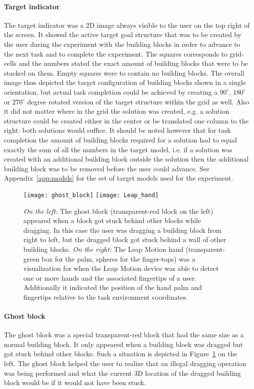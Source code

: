 \paragraph{Target indicator}
The target indicator was a 2D image always visible to the user on the top right of the screen. It showed the active target goal structure that was to be created by the user during the experiment with the building blocks in order to advance to the next task and to complete the experiment. The squares corresponds to grid-cells and the numbers stated the exact amount of building blocks that were to be stacked on them. Empty squares were to contain no building blocks. The overall image thus depicted the target configuration of building blocks shown in a single orientation, but actual task completion could be achieved by creating a $90^{\circ}$, $180^{\circ}$ or $270^{\circ}$ degree rotated version of the target structure within the grid as well. Also it did not matter where in the grid the solution was created, e.g. a solution structure could be created either in the center or be translated one column to the right: both solutions would suffice. It should be noted however that for task completion the amount of building blocks required for a solution had to equal exactly the sum of all the numbers in the target model, i.e. if a solution was created with an additional building block outside the solution then the additional building block was to be removed before the user could advance. See Appendix~\ref{app:models} for the set of target models used for the experiment.


\begin{figure}[H]
\centering
\texttt{[image: ghost\_block]}
\texttt{[image: Leap\_hand]}
\caption{\label{fig:ghostblock} \textit{On the left:} The ghost block (transparent-red block on the left) appeared when a block got stuck behind other blocks while dragging. 
In this case the user was dragging a building block from right to left, but the dragged block got stuck behind a wall of other building blocks. \textit{On the right:} The Leap 
Motion hand (transparent-green box for the palm, spheres for the finger-tops) was a visualization for when the Leap Motion device was able to detect one or more hands and the 
associated fingertips of a user. Additionally it indicated the  position of the hand palm and fingertips relative to the task environment coordinates. 
}
\end{figure}

\paragraph{Ghost block}
The ghost block was a special transparent-red block that had the same size as a normal building block. It only appeared when a building block was dragged but got stuck behind 
other blocks. Such a situation is depicted in Figure~\ref{fig:ghostblock} on the left. The ghost block helped the user to realize that an illegal dragging operation was being 
performed and what the current 3D location of the dragged building block would be if it would not have been stuck.


